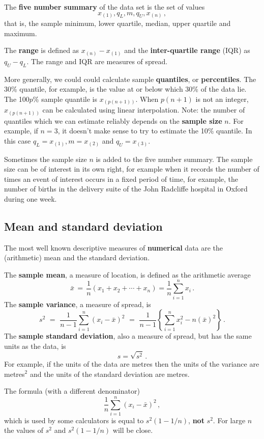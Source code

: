 \documentclass[
  british,
]{book}
\begin{document}
The \textbf{five number summary} of the data set is the set of values
\[x_{(1)},q_L,m,q_U,x_{(n)}\,,\]
that is, the sample minimum, lower quartile, median, upper quartile and maximum.

The \textbf{range} is defined as \(x_{(n)}-x_{(1)}\) and the \textbf{inter-quartile
range} (IQR) as \(q_U-q_L\). The range and IQR are measures of spread.

More generally, we could could calculate sample \textbf{quantiles}, or \textbf{percentiles}. The 30\% quantile, for example, is the value at or below which 30\% of the data lie. The 100\(p\)\% sample quantile is \(x_{(p(n+1))}\). When \(p(n+1)\) is not an integer, \(x_{(p(n+1))}\) can be calculated using linear interpolation. Note: the number of quantiles which we can estimate reliably depends on the \textbf{sample size} \(n\). For example, if \(n=3\), it doesn't make sense to try to estimate the 10\% quantile. In this case \(q_L=x_{(1)}, m=x_{(2)}\) and \(q_U=x_{(3)}\).

Sometimes the sample size \(n\) is added to the five number summary. The
sample size can be of interest in its own right, for example when it records the
number of times an event of interest occurs in a fixed period of time,
for example, the number of births in the delivery suite of the John Radcliffe
hospital in Oxford during one week.

\hypertarget{meanstdev}{%
\subsection{Mean and standard deviation}\label{meanstdev}}

The most well known descriptive measures of \textbf{numerical} data are the (arithmetic) mean and the standard deviation.

The \textbf{sample mean}, a measure of location, is defined as the arithmetic average
\[ \bar{x}\,=\,\frac{1}{n}(x_1+x_2+\cdots+x_n)=\frac{1}{n}\sum_{i=1}^n x_i\,.\]
The \textbf{sample variance}, a measure of spread, is
\[ s^2 \,\,=\,\, \frac{1}{n-1}\sum_{i=1}^n (x_i-\bar{x})^2 \,\,=\,\, \frac{1}{n-1}\left\{\sum_{i=1}^n x_i^2 - n(\bar{x})^2\right\}\,.\]
The \textbf{sample standard deviation}, also a measure of spread, but has the same units as the data, is
\[ s=\sqrt{s^2} \,.\]
For example, if the units of the data are metres then the units of the variance are metres\(^2\) and the units of the standard deviation are metres.

The formula (with a different denominator)
\[ \frac{1}{n}\sum_{i=1}^n (x_i-\bar{x})^2 \,,\]
which is used by some calculators is equal to \(s^2 (1-1/n)\), \textbf{not} \(s^2\). For large \(n\) the values of \(s^2\) and \(s^2(1-1/n)\) will be close.
\end{document}
